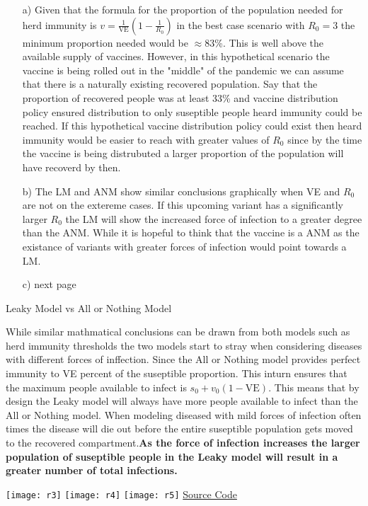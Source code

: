 \documentclass{report}
\begin{document}
\begin{itemize}
        \item[a)]{Given that the formula for the proportion of the population needed  for herd immunity is $v = \frac{1}{\text{VE}}(1-\frac{1}{R_0})$ in the best case scenario with $R_0 = 3$ the minimum proportion needed would be $\approx$83\%. This is well above the available supply of vaccines. However, in this hypothetical scenario the vaccine is being rolled out in the "middle" of the pandemic we can assume that there is a naturally existing recovered population. Say that the proportion of recovered people was at least 33\% and vaccine distribution policy ensured distribution to only suseptible people heard immunity could be reached. If this hypothetical vaccine distribution policy could exist then heard immunity would be easier to reach with greater values of $R_0$ since by the time the vaccine is being distrubuted a larger proportion of the population will have recoverd by then.}
        \item[b)]{The LM and ANM show similar conclusions graphically when VE and $R_0$ are not on the extereme cases. If this upcoming variant has a significantly larger $R_0$ the LM will show the increased force of infection to a greater degree than the ANM. While it is hopeful to think that the vaccine is a ANM as the existance of variants with greater forces of infection would point towards a LM.}
        \item[c)]{\sol next page}
\end{itemize}
\newpage
\begin{center}
        \huge{Leaky Model vs All or Nothing Model}
\end{center}
While similar mathmatical conclusions can be drawn from both models such as herd immunity thresholds the two models start to stray when considering diseases with different forces of inffection. Since the All or Nothing  model provides perfect immunity to VE percent of the suseptible proportion. This inturn ensures that the maximum people available to infect is $s_0 + v_0(1-\text{VE})$. This means that by design the Leaky model will always have more people available to infect than the All or Nothing model. When modeling diseased with mild forces of infection often times the disease will die out before the entire suseptible population gets moved to the recovered compartment.\textbf{As the force of infection increases the larger  population  of suseptible people in the Leaky model will result in a greater number of total infections.}
\begin{center}
        \texttt{[image: r3]}
        \texttt{[image: r4]}
        \texttt{[image: r5]}
        \href{https://google.com}{Source Code}
\end{center}
\end{document}
